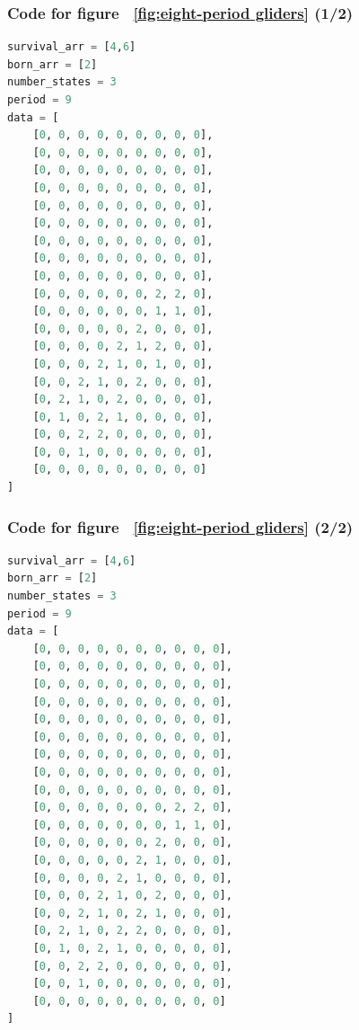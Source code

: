 \documentclass[12pt]{article}
\numberwithin{figure}{section} %
\begin{document}
\subsubsection{Code for figure ~\ref{fig:eight-period gliders} (1/2)}
\label{subsubsection:eight-period gliders (1/2)}
\begin{lstlisting}[language = Python]
survival_arr = [4,6]
born_arr = [2]
number_states = 3
period = 9
data = [
    [0, 0, 0, 0, 0, 0, 0, 0, 0],
    [0, 0, 0, 0, 0, 0, 0, 0, 0],
    [0, 0, 0, 0, 0, 0, 0, 0, 0],
    [0, 0, 0, 0, 0, 0, 0, 0, 0],
    [0, 0, 0, 0, 0, 0, 0, 0, 0],
    [0, 0, 0, 0, 0, 0, 0, 0, 0],
    [0, 0, 0, 0, 0, 0, 0, 0, 0],
    [0, 0, 0, 0, 0, 0, 0, 0, 0],
    [0, 0, 0, 0, 0, 0, 0, 0, 0],
    [0, 0, 0, 0, 0, 0, 2, 2, 0],
    [0, 0, 0, 0, 0, 0, 1, 1, 0],
    [0, 0, 0, 0, 0, 2, 0, 0, 0],
    [0, 0, 0, 0, 2, 1, 2, 0, 0],
    [0, 0, 0, 2, 1, 0, 1, 0, 0],
    [0, 0, 2, 1, 0, 2, 0, 0, 0],
    [0, 2, 1, 0, 2, 0, 0, 0, 0],
    [0, 1, 0, 2, 1, 0, 0, 0, 0],
    [0, 0, 2, 2, 0, 0, 0, 0, 0],
    [0, 0, 1, 0, 0, 0, 0, 0, 0],
    [0, 0, 0, 0, 0, 0, 0, 0, 0]
]

\end{lstlisting}

\subsubsection{Code for figure ~\ref{fig:eight-period gliders} (2/2)}
\label{subsubsection:eight-period gliders (2/2)}
\begin{lstlisting}[language = Python]
survival_arr = [4,6]
born_arr = [2]
number_states = 3
period = 9
data = [
    [0, 0, 0, 0, 0, 0, 0, 0, 0, 0],
    [0, 0, 0, 0, 0, 0, 0, 0, 0, 0],
    [0, 0, 0, 0, 0, 0, 0, 0, 0, 0],
    [0, 0, 0, 0, 0, 0, 0, 0, 0, 0],
    [0, 0, 0, 0, 0, 0, 0, 0, 0, 0],
    [0, 0, 0, 0, 0, 0, 0, 0, 0, 0],
    [0, 0, 0, 0, 0, 0, 0, 0, 0, 0],
    [0, 0, 0, 0, 0, 0, 0, 0, 0, 0],
    [0, 0, 0, 0, 0, 0, 0, 0, 0, 0],
    [0, 0, 0, 0, 0, 0, 0, 2, 2, 0],
    [0, 0, 0, 0, 0, 0, 0, 1, 1, 0],
    [0, 0, 0, 0, 0, 0, 2, 0, 0, 0],
    [0, 0, 0, 0, 0, 2, 1, 0, 0, 0],
    [0, 0, 0, 0, 2, 1, 0, 0, 0, 0],
    [0, 0, 0, 2, 1, 0, 2, 0, 0, 0],
    [0, 0, 2, 1, 0, 2, 1, 0, 0, 0],
    [0, 2, 1, 0, 2, 2, 0, 0, 0, 0],
    [0, 1, 0, 2, 1, 0, 0, 0, 0, 0],
    [0, 0, 2, 2, 0, 0, 0, 0, 0, 0],
    [0, 0, 1, 0, 0, 0, 0, 0, 0, 0],
    [0, 0, 0, 0, 0, 0, 0, 0, 0, 0]
]
\end{lstlisting}
\end{document}
